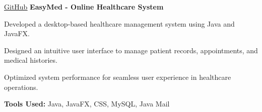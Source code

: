\vspace{0.2 cm}
\begin{twocolentry}{
    \underline{\href{https://github.com/rajubeparybd/EasyMed}{GitHub}}
}
    \textbf{EasyMed - Online Healthcare System}\end{twocolentry}

\vspace{0.10 cm}
\begin{onecolentry}
    \begin{highlights}
        \item Developed a desktop-based healthcare management system using Java and JavaFX.
        \item Designed an intuitive user interface to manage patient records, appointments, and medical histories.
        \item Optimized system performance for seamless user experience in healthcare operations.
        \item \textbf{Tools Used:} Java, JavaFX, CSS, MySQL, Java Mail 
    \end{highlights}
\end{onecolentry}

